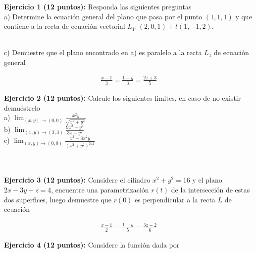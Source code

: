 \documentclass[a4paper]{article}
\begin{document}
\setlength{\parindent}{0cm}

\textbf{Ejercicio 1 \textbf{(12 puntos)}:} Responda las siguientes preguntas \\


a) Determine la ecuación general del plano que pasa por el punto $(1,1,1)$ y que contiene a la recta de ecuación vectorial $L_1: (2,0,1)+t(1,-1,2)$. \\

\ 

c) Demuestre que el plano  encontrado en a) es paralelo a la recta $L_1$ de ecuación general 

\begin{align*}
    \frac{x-1}{3} = \frac{1-y}{3} =\frac{2z+3}{5}
\end{align*}


\newpage


\phantom{xc}


\newpage

\textbf{Ejercicio 2 \textbf{(12 puntos)}:} Calcule los siguientes límites, en caso de no existir demuéstrelo \\

a) $\displaystyle \lim_{(x,y) \to (0,0)} \frac{x^2y}{\sqrt{x^2+y^2}}$ \\


b) $\displaystyle \lim_{(x,y) \to (3,3)} \frac{9x^2-y^4}{3x-y^2}$ \\

c) $\displaystyle \lim_{(x,y) \to (0,0)} \frac{x^3-3x^2y}{(x^2+y^2)^{3/2}}$ \\ \\ \\

\newpage


\phantom{xc}

\newpage


\textbf{Ejercicio 3 \textbf{(12 puntos)}:} Considere el cilindro $x^2+y^2=16$ y el plano $2x-3y+z=4$, encuentre una parametrización $r(t)$ de la intersección de estas dos superfices, luego demuestre que $r(0)$ es perpendicular a la recta $L$ de ecuación

\begin{align*}
    \frac{x-1}{2} = \frac{1-y}{5} = \frac{3z-2}{6}
\end{align*}

\newpage


\phantom{xc}


\newpage


\textbf{Ejercicio 4 \textbf{(12 puntos)}:} Considere la función dada por 
\end{document}
